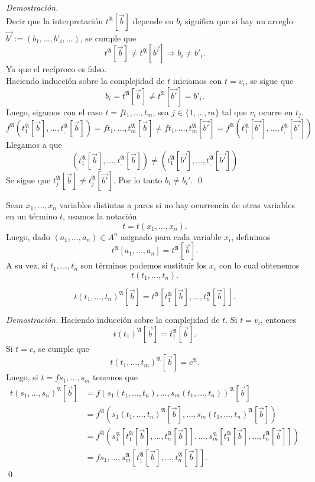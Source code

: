 \emph{Demostraci\'on.}\\
Decir que la interpretaci\'on $t^{\mathfrak{A}} [\vec{b}]$ depende en $b_i$ significa que si hay un arreglo $\vec{b'} := (b_1, \dots, b'_i, \dots)$, se cumple que 
\[ t^{\mathfrak{A}} [\vec{b}] \neq t^{\mathfrak{A}} [\vec{b'}] \Longrightarrow b_i \neq b'_i. \]
Ya que el rec\'iproco es falso.\\
Haciendo inducci\'on sobre la complejidad de $t$ iniciamos con $t = v_i$, se sigue que 
\[ b_i = t^{\mathfrak{A}} [\vec{b}] \neq t^{\mathfrak{A}} [\vec{b'}] = b'_i. \]
Luego, sigamos con el caso $t = f t_1, \dots, t_m$, sea $j \in \{ 1, \dots, m \}$ tal que $v_i$ ocurre en $t_j$. 
\[ f^{\mathfrak{A}} (t^{\mathfrak{A}}_1 [\vec{b}], \dots, t^{\mathfrak{A}}_, [\vec{b}]) = f t_1, \dots, t_m^{\mathfrak{A}} [\vec{b}] \neq f t_1, \dots, t_m^{\mathfrak{A}} [\vec{b'}] = f^{\mathfrak{A}} (t^{\mathfrak{A}}_1 [\vec{b'}], \dots, t^{\mathfrak{A}}_, [\vec{b'}]) \]
Llegamos a que 
\[ (t^{\mathfrak{A}}_1 [\vec{b}], \dots, t^{\mathfrak{A}}_, [\vec{b}]) \neq (t^{\mathfrak{A}}_1 [\vec{b'}], \dots, t^{\mathfrak{A}}_, [\vec{b'}]) \]
Se sigue que $t_j^{\mathfrak{A}} [\vec{b}] \neq t_j^{\mathfrak{A}} [\vec{b'}]$.
Por lo tanto $b_i \neq b_i'$. \qed
\newpage
\begin{definition}
  Sean $x_1, \dots, x_n$ variables distintas a pares si no hay ocurrencia de otras variables en un t\'ermino $t$, usamos la notaci\'on
  \[ t = t(x_1, \dots, x_n). \]
  Luego, dado $(a_1, \dots, a_n) \in A^n$ asignado para cada variable $x_i$, definimos
  \[ t^{\mathfrak{A}} \left[ a_1, \dots, a_n \right] = t^{\mathfrak{A}} \left[ \vec{b} \right]. \]
  A su vez, si $t_1, \dots, t_n$ son t\'erminos podemos sustituir los $x_i$ con lo cual obtenemos
  \[ t (t_1, \dots, t_n). \]
\end{definition}
\begin{lemma}
  \[ t (t_1, \dots, t_n)^{\mathfrak{A}} [ \vec{b} ] = t^{\mathfrak{A}} \left[ t_1^{\mathfrak{A}} [ \vec{b} ], \dots, t_n^{\mathfrak{A}} [ \vec{b} ] \right]. \]
\end{lemma} \hfill \break
\emph{Demostraci\'on.} \hfill \break
Haciendo inducci\'on sobre la complejidad de $t$.
Si $t = v_i$, entonces 
\[ t(t_1)^{\mathfrak{A}} [\vec{b}] = t_1^{\mathfrak{A}} [\vec{b}]. \]
Si $t = c$, se cumple que
\[ t (t_1, \dots, t_m)^{\mathfrak{A}} [\vec{b}] = c^{\mathfrak{A}}. \]
Luego, si $t = f s_1 , \dots, s_m$ tenemos que 
\begin{align*}
t(s_1, \dots, s_n)^{\mathfrak{A}} [\vec{b}] &= f (s_1 (t_1, \dots, t_n), \dots, s_m (t_1, \dots, t_n))^{\mathfrak{A}} [\vec{b}]\\
  &= f^{\mathfrak{A}} (s_1 (t_1, \dots, t_n)^{\mathfrak{A}} [\vec{b}], \dots, s_m (t_1, \dots, t_n)^{\mathfrak{A}} [\vec{b}])\\
  &= f^{\mathfrak{A}} \left(s_1^{\mathfrak{A}} \left[ t_1^{\mathfrak{A}} [\vec{b}], \dots, t_n^{\mathfrak{A}} [\vec{b}] \right], \dots, s_m^{\mathfrak{A}} \left[ t_1^{\mathfrak{A}} [\vec{b}], \dots, t_n^{\mathfrak{A}}[\vec{b} ]\right] \right)\\
  &= f s_1, \dots, s_m^{\mathfrak{A}} \left[ t_1^{\mathfrak{A}} [\vec{b}], \dots, t_n^{\mathfrak{A}} [\vec{b}] \right].
\end{align*} \qed
